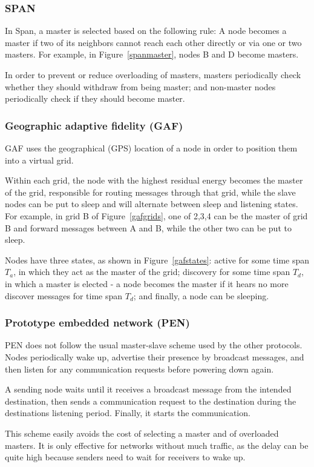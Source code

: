 \subsubsection{SPAN}
In Span\cite{chen2002span}, a master is selected based on the following rule:
A node becomes a master if two of its neighbors cannot reach each other directly
or via one or two masters. For example, in Figure~\ref{spanmaster}, nodes B and
D become masters.

In order to prevent or reduce overloading of masters, masters periodically
check whether they should withdraw from being master; and non-master nodes
periodically check if they should become master.


\subsubsection{Geographic adaptive fidelity (GAF)}
\label{gaf}
GAF\cite{xu2001geography} uses the geographical (GPS) location of a node in
order to position them into a virtual grid.

Within each grid, the node with the highest residual energy becomes the master
of the grid, responsible for routing messages through that grid, while the
slave nodes can be put to sleep and will alternate between sleep and listening
states. For example, in grid B of Figure~\ref{gafgrids}, one of 2,3,4 can be the
master of grid B and forward messages between A and B, while the other two can
be put to sleep.

Nodes have three states, as shown in Figure~\ref{gafstates}: active for some time span $T_{a}$, in which they
act as the master of the grid; discovery for some time span $T_{d}$, in which a
master is elected - a node becomes the master if it hears no more discover messages
for time span $T_{d}$; and finally, a node can be sleeping.


\subsubsection{Prototype embedded network (PEN)}
PEN\cite{girling2000design} does not follow the usual master-slave scheme
used by the other protocols. Nodes periodically wake up, advertise their
presence
by broadcast messages, and then listen for any communication requests before
powering down again.

A sending node waits until it receives a broadcast message from the intended
destination, then sends a communication request to the destination during
the destinations listening period. Finally, it starts the communication.

This scheme easily avoids the cost of selecting a master and of overloaded
masters. It is only effective for networks without much traffic, as the delay
can be quite high because senders need to wait for receivers to wake up.
